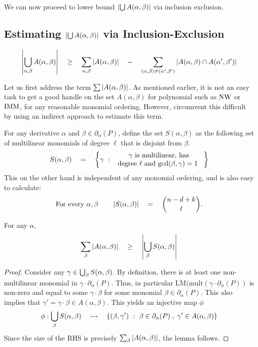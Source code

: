 We can now proceed to lower bound $\left|\bigcup A(\alpha, \beta)\right|$ via inclusion exclusion.

\subsection*{Estimating $\left|\bigcup A(\alpha, \beta)\right|$ via Inclusion-Exclusion}
\[
\left|\bigcup_{\alpha, \beta}A(\alpha,\beta)\right|\quad \geq \quad \sum_{\alpha,\beta}\left|A(\alpha, \beta)\right| \quad - \quad \sum_{(\alpha, \beta)\neq (\alpha',\beta')}\left|A(\alpha, \beta) \cap A(\alpha',\beta')\right|
\]

Let us first address the term $\sum \left|A(\alpha, \beta)\right|$. 
As mentioned earlier, it is not an easy task to get a good handle on the set $A(\alpha, \beta)$ for polynomial such as $\operatorname{\mathrm{NW}}$ or $\operatorname{\mathrm{IMM}}$, for any reasonable monomial ordering. 
However, \cite{KS14} circumvent this difficult by using an indirect approach to estimate this term. 

For any derivative $\alpha$ and $\beta \in \partial_\alpha(P)$, define the set $S(\alpha, \beta)$ as the following set of multilinear monomials of degree $\ell$ that is disjoint from $\beta$. 
\[
S(\alpha, \beta) \quad = \quad \left\{{\gamma}\ : \ {\begin{array}{c}\text{$\gamma$ is multilinear, has}\\\text{degree $\ell$ and $\gcd(\beta,\gamma)=1$ }\end{array}}\right\}
\]
This on the other hand is independent of any monomial ordering, and is also easy to calculate:
\[
\text{For every $\alpha, \beta$}\quad\quad \left|S(\alpha, \beta)\right| \quad = \quad \binom{n - d + k}{\ell}.
\] 
\begin{lemma}[\cite{KS14}]\label{lem:As-to-Ss}
For any $\alpha$, 
\[
\sum_{\beta} \left|A(\alpha, \beta)\right| \quad \geq \quad \left|\bigcup_{\beta} S(\alpha, \beta)\right|
\]
\end{lemma}
\begin{proof}
Consider any $\gamma \in \bigcup_{\beta}S(\alpha, \beta)$. 
By definition, there is at least one non-multilinear monomial in $\gamma \cdot \partial_\alpha(P)$. 
Thus, in particular $\mathrm{LM}(\mathrm{mult}(\gamma \cdot \partial_\alpha(P))$ is non-zero and equal to some $\gamma \cdot \beta$ for some monomial $\beta \in \partial_\alpha(P)$. 
This also implies that $\gamma' = \gamma\cdot \beta \in A(\alpha, \beta)$. 
This yields an injective map $\phi$ 
\[
\phi:\bigcup_\beta S(\alpha,\beta) \quad \rightarrowtail \quad \left\{{(\beta, \gamma')}\ : \ {\beta\in \partial_\alpha(P)\;,\;\gamma' \in A(\alpha, \beta)}\right\}
\] 
Since the size of the RHS is precisely $\sum_\beta \left|A(\alpha, \beta)\right|$, the lemma follows. 
\end{proof}

